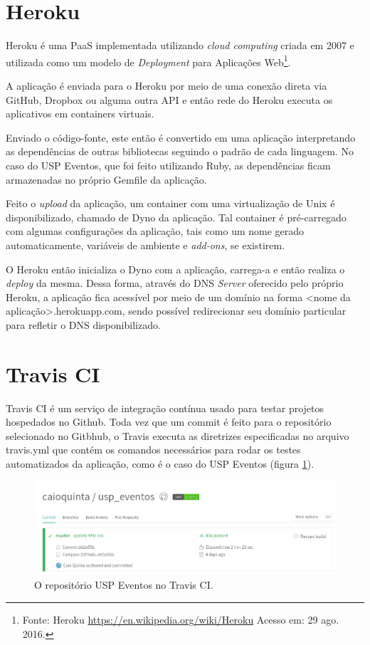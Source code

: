 \section{Heroku}
\par Heroku é uma PaaS implementada utilizando \emph{cloud computing} criada em 2007 e utilizada como um modelo de \emph{Deployment} para Aplicações Web\footnote{Fonte: Heroku \url{https://en.wikipedia.org/wiki/Heroku} Acesso em: 29 ago. 2016.}.
\par  A aplicação é enviada para o Heroku por meio de uma conexão direta via GitHub, Dropbox ou alguma outra API e então rede do Heroku executa os aplicativos em containers virtuais.
\par Enviado o código-fonte, este então é convertido em uma aplicação interpretando as dependências de outras bibliotecas seguindo o padrão de cada linguagem. No caso do USP Eventos, que foi feito utilizando Ruby, as dependências ficam armazenadas no próprio Gemfile da aplicação.
\par Feito o \emph{upload} da aplicação, um container com uma virtualização de Unix é disponibilizado, chamado de Dyno da aplicação. Tal container é pré-carregado com algumas configurações da aplicação, tais como um nome gerado automaticamente, variáveis de ambiente e \emph{add-ons}, se existirem.
\par O Heroku então inicializa o Dyno com a aplicação, carrega-a e então realiza o \emph{deploy} da mesma. Dessa forma, através do DNS \emph{Server} oferecido pelo próprio Heroku, a aplicação fica acessível por meio de um domínio na forma <nome da aplicação>.herokuapp.com, sendo possível redirecionar seu domínio particular para refletir o DNS disponibilizado.
\section{Travis CI}
\par Travis CI é um serviço de integração contínua usado para testar projetos hospedados no Github. Toda vez que um commit é feito para o repositório selecionado no Gitbhub, o Travis executa as diretrizes especificadas no arquivo travis.yml que contém os comandos necessários para rodar os testes automatizados da aplicação, como é o caso do USP Eventos (figura \ref{fig:travis}).
\begin{figure}[htb]
\centering
\includegraphics[width=15cm]{figuras/travis}
\caption{\label{fig:travis} O repositório USP Eventos no Travis CI.}
\end{figure}

